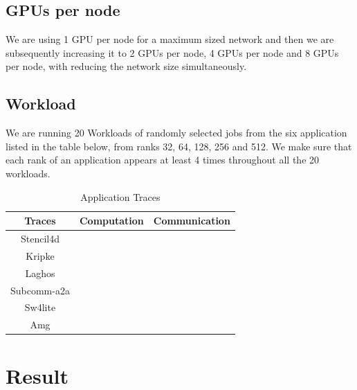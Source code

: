 \documentclass[conference]{IEEEtran}
\newcommand{\xmark}{\ding{55}}%
\newcommand{\cmark}{\ding{51}}%
\begin{document}
\subsection{GPUs per node}
 
We are using 1 GPU per node for a maximum sized network and then we are subsequently increasing it to 2 GPUs per node, 4 GPUs per node and 8 GPUs per node, with reducing the network size simultaneously.

\subsection{Workload}

We are running 20 Workloads of randomly selected jobs from the six application listed in the table below, from ranks 32, 64, 128, 256 and 512. We make sure that each rank of an application appears at least 4 times throughout all the 20 workloads.

\begin{table}[htbp]
\caption{Application Traces}
\begin{center}
\begin{tabular}{|c|c|c|} \hline

\hline
\textbf{Traces} & \textbf{Computation} & \textbf{Communication} \\ \hline
Stencil4d & \xmark & \cmark  \\    \hline
Kripke & \cmark & \xmark  \\    \hline
Laghos & \cmark & \xmark  \\    \hline
Subcomm-a2a & \xmark & \cmark  \\    \hline
Sw4lite & \cmark  & \cmark  \\    \hline
Amg & \cmark  & \cmark  \\    \hline
\end{tabular}
\label{tab1}
\end{center}
\end{table}

\section{Result}
\end{document}
